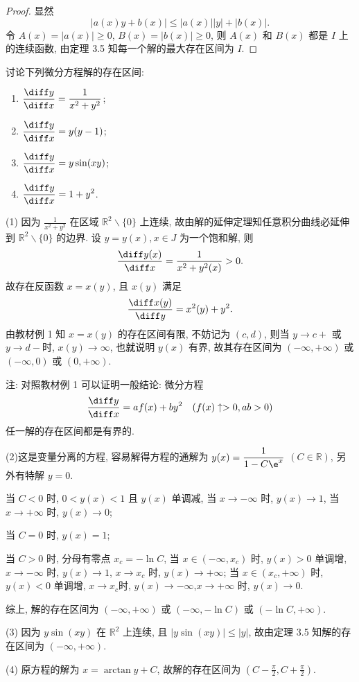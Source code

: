 \begin{proof}
  显然
  \[|a(x)y+b(x)|\leq|a(x)||y|+|b(x)|.\]
  令 $A(x)=|a(x)|\geq 0$, $B(x)=|b(x)|\geq 0$,
  则 $A(x)$ 和 $B(x)$ 都是 $I$ 上的连续函数, 由定理 3.5 知每一个解的最大存在区间为 $I$.
\end{proof}



\begin{exercise}
  讨论下列微分方程解的存在区间:
  \begin{enumerate}[(1)]
  \item $\displaystyle\frac{\diff y}{\diff x}=\frac{1}{x^2+y^2}$;
  \item $\displaystyle\frac{\diff y}{\diff x}=y(y-1)$;
  \item $\displaystyle\frac{\diff y}{\diff x}=y\sin(xy)$;
  \item $\displaystyle\frac{\diff y}{\diff x}=1+y^2$.
  \end{enumerate}
\end{exercise}

\begin{solve}
  (1) 因为 $\frac{1}{x^2+y^2}$ 在区域 $\mathbb{R}^2\backslash\{0\}$ 上连续,
  故由解的延伸定理知任意积分曲线必延伸到 $\mathbb{R}^2\backslash\{0\}$ 的边界.
  设 $y=y(x),x\in J$ 为一个饱和解, 则
  \[\frac{\diff y(x)}{\diff x}=\frac{1}{x^2+y^2(x)}>0.\]
  故存在反函数 $x=x(y)$, 且 $x(y)$ 满足
  \[\frac{\diff x(y)}{\diff y}=x^2(y)+y^2.\]
  由教材例 1 知 $x=x(y)$ 的存在区间有限, 不妨记为 $(c,d)$,
  则当 $y\to c+$ 或 $y\to d-$时, $x(y)\to\infty$, 也就说明 $y(x)$ 有界,
  故其存在区间为 $(-\infty,+\infty)$ 或 $(-\infty,0)$ 或 $(0,+\infty)$.

  注: 对照教材例 1 可以证明一般结论: 微分方程
  \[\frac{\diff y}{\diff x}=af(x)+by^2\quad (f(x)\uparrow>0,ab>0)\]
  任一解的存在区间都是有界的.

  (2)这是变量分离的方程, 容易解得方程的通解为
  $\displaystyle y(x)=\frac{1}{1-C\e^x}$ $(C\in\mathbb{R})$, 另外有特解 $y=0$.

  当 $C<0$ 时, $0<y(x)<1$ 且 $y(x)$ 单调减,
  当 $x\to-\infty$ 时, $y(x)\to 1$, 当 $x\to+\infty$ 时, $y(x)\to 0$;

  当 $C=0$ 时, $y(x)=1$;

  当 $C>0$ 时, 分母有零点 $x_c=-\ln C$, 当 $x\in(-\infty,x_c)$ 时, $y(x)>0$ 单调增,
  $x\to-\infty$ 时, $y(x)\to1$, $x\to x_c$ 时, $y(x)\to+\infty$;
  当 $x\in(x_c,+\infty)$ 时, $y(x)<0$ 单调增, $x\to x_c$时,
  $y(x)\to-\infty$,$x\to+\infty$ 时, $y(x)\to0$.

  综上, 解的存在区间为 $(-\infty,+\infty)$ 或 $(-\infty,-\ln C)$ 或 $(-\ln C,+\infty)$.

  (3) 因为 $y\sin(xy)$ 在 $\mathbb{R}^2$ 上连续,
  且 $|y\sin(xy)|\leq|y|$, 故由定理 3.5 知解的存在区间为 $(-\infty,+\infty)$.

  (4) 原方程的解为 $x=\arctan y+C$, 故解的存在区间为 $(C-\frac{\pi}{2},C+\frac{\pi}{2})$.
\end{solve}



